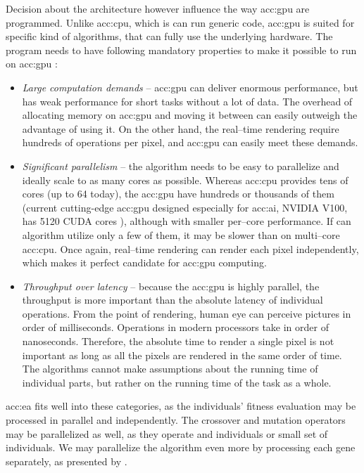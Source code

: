 Decision about the architecture however influence the way \acrshort{acc:gpu} are programmed. Unlike \acrshort{acc:cpu}, which is can run generic code, \acrshort{acc:gpu} is suited for specific kind of algorithms, that can fully use the underlying hardware. The program needs to have following mandatory properties to make it possible to run on \acrshort{acc:gpu} \citep{GPUComputingOwens}:
\begin{itemize}
    \item \textit{Large computation demands} -- \acrshort{acc:gpu} can deliver enormous performance, but has weak performance for short tasks without a lot of data. The overhead of allocating memory on \acrshort{acc:gpu} and moving it between can easily outweigh the advantage of using it. On the other hand, the real--time rendering require hundreds of operations per pixel, and \acrshort{acc:gpu} can easily meet these demands.
    \item \textit{Significant parallelism} -- the algorithm needs to be easy to parallelize and ideally scale to as many cores as possible. Whereas \acrshort{acc:cpu} provides tens of cores (up to 64 today), the \acrshort{acc:gpu} have hundreds or thousands of them (current cutting-edge \acrshort{acc:gpu} designed especially for \acrshort{acc:ai}, NVIDIA V100, has 5120 CUDA cores \citep{nvidiav100spec}), although with smaller per--core performance. If can algorithm utilize only a few of them, it may be slower than on multi--core \acrshort{acc:cpu}. Once again, real--time rendering can render each pixel independently, which makes it perfect candidate for \acrshort{acc:gpu} computing.
    \item \textit{Throughput over latency} -- because the \acrshort{acc:gpu} is highly parallel, the throughput is more important than the absolute latency of individual operations. From the point of rendering, human eye can perceive pictures in order of milliseconds. Operations in modern processors take in order of nanoseconds. Therefore, the absolute time to render a single pixel is not important as long as all the pixels are rendered in the same order of time. The algorithms cannot make assumptions about the running time of individual parts, but rather on the running time of the task as a whole.
\end{itemize}

\acrlong{acc:ea} fits well into these categories, as the individuals' fitness evaluation may be processed in parallel and independently. The crossover and mutation operators may be parallelized as well, as they operate and individuals or small set of individuals. We may parallelize the algorithm even more by processing each gene separately, as presented by \citet{CHENG2019514}.


